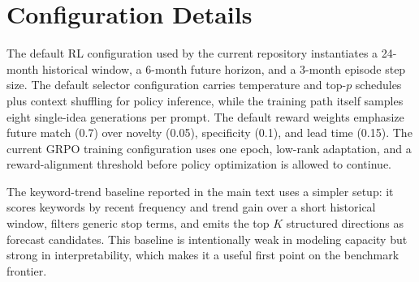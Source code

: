 \documentclass{article} %
\begin{document}
\section{Configuration Details}

The default RL configuration used by the current repository instantiates a 24-month historical window, a 6-month future horizon, and a 3-month episode step size. The default selector configuration carries temperature and top-$p$ schedules plus context shuffling for policy inference, while the training path itself samples eight single-idea generations per prompt. The default reward weights emphasize future match (0.7) over novelty (0.05), specificity (0.1), and lead time (0.15). The current GRPO training configuration uses one epoch, low-rank adaptation, and a reward-alignment threshold before policy optimization is allowed to continue.

The keyword-trend baseline reported in the main text uses a simpler setup: it scores keywords by recent frequency and trend gain over a short historical window, filters generic stop terms, and emits the top $K$ structured directions as forecast candidates. This baseline is intentionally weak in modeling capacity but strong in interpretability, which makes it a useful first point on the benchmark frontier.
\end{document}
